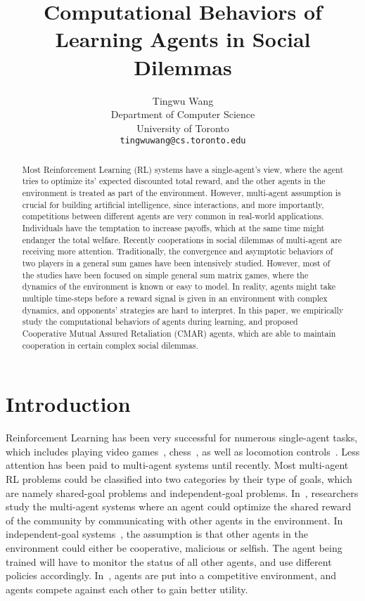\documentclass{article}
\title{Computational Behaviors of Learning Agents in Social Dilemmas}
\author{
  Tingwu Wang\\
  Department of Computer Science\\
  University of Toronto\\
  \texttt{tingwuwang@cs.toronto.edu} \\
}
\begin{document}
\maketitle
\begin{abstract}
Most Reinforcement Learning (RL) systems have a single-agent's view,
where the agent tries to optimize its' expected discounted total reward,
    and the other agents in the environment is treated as part of the environment.
However, multi-agent assumption is crucial for building artificial intelligence,
since interactions, and more importantly,
competitions between different agents are very common in real-world applications.
Individuals have the temptation to increase payoffs, which at the same time
might endanger the total welfare. %
Recently cooperations in social dilemmas of multi-agent are receiving more attention.
Traditionally, the convergence and asymptotic behaviors of two players
in a general sum games have been intensively studied.
However, most of the studies have been focused on simple general sum matrix games,
where the dynamics of the environment is known or easy to model.
In reality, agents might take multiple time-steps before a reward signal is given
in an environment with complex dynamics,
and opponents' strategies are hard to interpret.
In this paper, we empirically study the computational behaviors of agents during learning,
and proposed Cooperative Mutual Assured Retaliation (CMAR) agents,
which are able to maintain cooperation in certain complex social dilemmas.
\end{abstract}

\section{Introduction}
Reinforcement Learning has been very successful for numerous single-agent tasks, which includes playing video games~\cite{mnih2015human},
chess~\cite{silver2016mastering,silver2017mastering},
as well as locomotion controls~\cite{gae,trpo,ppo}.
Less attention has been paid to multi-agent systems until recently.
Most multi-agent RL problems could be classified into two categories by their type of goals,
which are namely shared-goal problems and independent-goal problems.
In~\cite{tuyls2018symmetric,foerster2017learning,sukhbaatar2016learning},
researchers study the multi-agent systems where an agent could optimize the shared reward of the community by communicating with other agents in the environment.
In independent-goal systems~\cite{lerer2017maintaining,leibo2017multi},
the assumption is that other agents in the environment could either be cooperative,
malicious or selfish.
The agent being trained will have to monitor the status of all other agents,
and use different policies accordingly. 
In~\cite{al2017continuous}, agents are put into a competitive environment,
and agents compete against each other to gain better utility.
\end{document}
